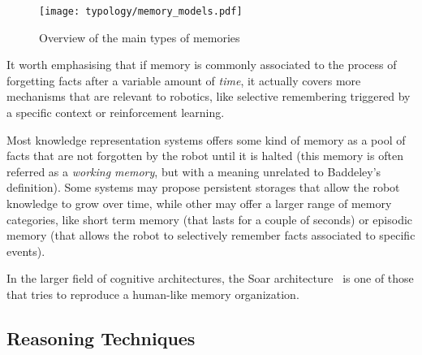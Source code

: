 \begin{figure}
    \centering
    \texttt{[image: typology/memory\_models.pdf]}
    \caption{Overview of the main types of memories}
    \label{fig|memory_models}
\end{figure}

It worth emphasising that if memory is commonly associated to the process of
forgetting facts after a variable amount of \emph{time}, it actually covers
more mechanisms that are relevant to robotics, like selective remembering
triggered by a specific context or reinforcement learning.

Most knowledge representation systems offers some kind of memory as a pool of
facts that are not forgotten by the robot until it is halted (this memory is
often referred as a \emph{working memory}, but with a meaning unrelated to
Baddeley's definition). Some systems may propose persistent storages that allow
the robot knowledge to grow over time, while other may offer a larger range of
memory categories, like short term memory (that lasts for a couple of seconds)
or episodic memory (that allows the robot to selectively remember facts
associated to specific events).

In the larger field of cognitive architectures, the {\sc Soar}
architecture~\cite{Lehman2006} is one of those that tries to reproduce a
human-like memory organization.

\subsection{Reasoning Techniques}
\label{sect|reasoning}

\begin{scriptsize}
\begin{center}
\end{center}
\end{scriptsize}


